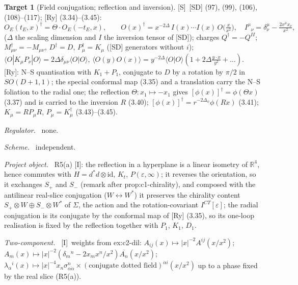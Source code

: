 \documentclass[11pt]{article}
\theoremstyle{definition}
\newtheorem{target}{Target}
\newcommand{\Sl}{\textup{[S]}}
\newcommand{\Il}{\textup{[I]}}
\newcommand{\fld}[1]{\par\textit{#1.}\ }
\begin{document}
\begin{target}[Field conjugation; reflection and inversion]\label{t:field}
\Sl\ [SD] (97), (99), (106), (108)--(117); [Ry] (3.34)--(3.45):
\[
O_E(t_E,x)^\dagger=\Theta\cdot O_E(-t_E,x),\qquad O(x)^\dagger=x^{-2\Delta}\,I(x)\cdots I(x)\,O\big(\tfrac x{x^2}\big),\quad I^\mu{}_\nu=\delta^\mu_\nu-\tfrac{2x^\mu x_\nu}{x^2},
\]
($\Delta$ the scaling dimension and $I$ the inversion tensor of [SD]); charges $Q^\dagger=-Q^{II}$; $M_{\mu\nu}^\dagger=-M_{\mu\nu}$, $D^\dagger=D$, $P_\mu^\dagger=K_\mu$ ([SD] generators without $i$); $\langle O|K_\mu P_\nu|O\rangle=2\Delta\delta_{\mu\nu}\langle O|O\rangle$, $\langle O(y)O(x)\rangle=y^{-2\Delta}\langle O|O\rangle(1+2\Delta\frac{y\cdot x}{y^2}+\dots)$. [Ry]: N--S quantisation with $K_1+P_1$, conjugate to $D$ by a rotation by $\pi/2$ in $SO(D+1,1)$; the special conformal map (3.35) and a translation carry the N--S foliation to the radial one; the reflection $\Theta:x_1\mapsto-x_1$ gives $[\phi(x)]^\dagger=\phi(\Theta x)$ (3.37) and is carried to the inversion $R$ (3.40); $[\phi(x)]^\dagger=r^{-2\Delta_\phi}\phi(Rx)$ (3.41); $K_\mu=RP_\mu R$, $P_\mu=K_\mu^\dagger$ (3.43)--(3.45).
\fld{Regulator} none. \fld{Scheme} independent.
\fld{Project object} R5(a) \Il: the reflection in a hyperplane is a linear isometry of $\mathbb R^4$, hence commutes with $H=d^*d\otimes\mathrm{id}$, $K_t$, $P(\varepsilon,\infty)$; it reverses the orientation, so it exchanges $S_+$ and $S_-$ (remark after prop:c1-chirality), and composed with the antilinear real-slice conjugation ($W\leftrightarrow W^*$) it preserves the chirality content $S_+\otimes W\oplus S_-\otimes W^*$ of $\Sigma$, the action and the rotation-covariant $I^{CT}[\varepsilon]$; the radial conjugation is its conjugate by the conformal map of [Ry] (3.35), so its one-loop realisation is fixed by the reflection together with $P_1$, $K_1$, $D_1$.
\fld{Two-component} \Il\ weights from ex:c2-dil: $A_{ij}(x)\mapsto|x|^{-2}A^{ij}(x/x^2)$; $A_m(x)\mapsto|x|^{-2}(\delta_m{}^n-2x_mx^n/x^2)\overline{A_n}(x/x^2)$; $\lambda_\alpha{}^i(x)\mapsto|x|^{-4}x_n\sigma^n_{\alpha\dot\alpha}\times(\text{conjugate dotted field})^{\dot\alpha i}(x/x^2)$ up to a phase fixed by the real slice (R5(a)).
\end{target}
\end{document}
